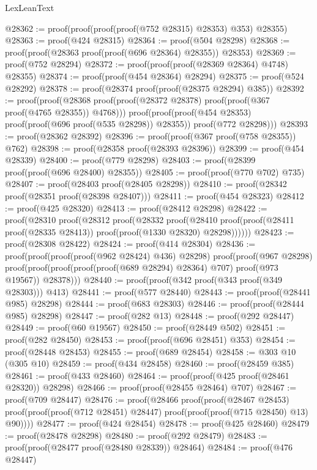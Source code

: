 \begin{lexlean}{LexLeanText}
\begin{coremodule}
@28362 := proof(proof(proof(proof(@752 @28315) @28353) @353) @28355)
@28363 := proof(@424 @28315)
@28364 := proof(@504 @28298)
@28368 := proof(proof(@28363 proof(proof(@696 @28364) @28355)) @28353)
@28369 := proof(@752 @28294)
@28372 := proof(proof(proof(@28369 @28364) @4748) @28355)
@28374 := proof(proof(@454 @28364) @28294)
@28375 := proof(@524 @28292)
@28378 := proof(@28374 proof(proof(@28375 @28294) @385))
@28392 := proof(proof(@28368
        proof(proof(@28372 @28378) proof(proof(@367 proof(@4765 @28355)) @4768)))
      proof(proof(proof(@454 @28353) proof(proof(@696 proof(@535 @28298)) @28355))
          proof(@772 @28298)))
@28393 := proof(@28362 @28392)
@28396 := proof(proof(@367 proof(@758 @28355)) @762)
@28398 := proof(@28358 proof(@28393 @28396))
@28399 := proof(@454 @28339)
@28400 := proof(@779 @28298)
@28403 := proof(@28399 proof(proof(@696 @28400) @28355))
@28405 := proof(proof(@770 @702) @735)
@28407 := proof(@28403 proof(@28405 @28298))
@28410 := proof(@28342 proof(@28351 proof(@28398 @28407)))
@28411 := proof(@454 @28323)
@28412 := proof(@425 @28320)
@28413 := proof(@28412 @28298)
@28422 := proof(@28310
      proof(@28312
          proof(@28332
              proof(@28410
                  proof(proof(@28411 proof(@28335 @28413)) proof(proof(@1330 @28320) @28298))))))
@28423 := proof(@28308 @28422)
@28424 := proof(@414 @28304)
@28436 := proof(proof(proof(proof(@962 @28424) @436) @28298)
      proof(proof(@967 @28298)
          proof(proof(proof(proof(proof(@689 @28294) @28364) @707) proof(@973 @19567)) @28378)))
@28440 := proof(proof(@342 proof(@343 proof(@349 @28303))) @413)
@28441 := proof(@577 @28440)
@28443 := proof(proof(@28441 @985) @28298)
@28444 := proof(@683 @28303)
@28446 := proof(proof(@28444 @985) @28298)
@28447 := proof(@282 @13)
@28448 := proof(@292 @28447)
@28449 := proof(@60 @19567)
@28450 := proof(@28449 @502)
@28451 := proof(@282 @28450)
@28453 := proof(proof(@696 @28451) @353)
@28454 := proof(@28448 @28453)
@28455 := proof(@689 @28454)
@28458 := @303 @10 (@305 @10)
@28459 := proof(@434 @28458)
@28460 := proof(@28459 @385)
@28461 := proof(@433 @28460)
@28464 := proof(proof(@425 proof(@28461 @28320)) @28298)
@28466 := proof(proof(@28455 @28464) @707)
@28467 := proof(@709 @28447)
@28476 := proof(@28466
      proof(proof(@28467 @28453)
          proof(proof(proof(@712 @28451) @28447) proof(proof(proof(@715 @28450) @13) @90))))
@28477 := proof(@424 @28454)
@28478 := proof(@425 @28460)
@28479 := proof(@28478 @28298)
@28480 := proof(@292 @28479)
@28483 := proof(proof(@28477 proof(@28480 @28339)) @28464)
@28484 := proof(@476 @28447)

\end{coremodule}
\end{lexlean}

